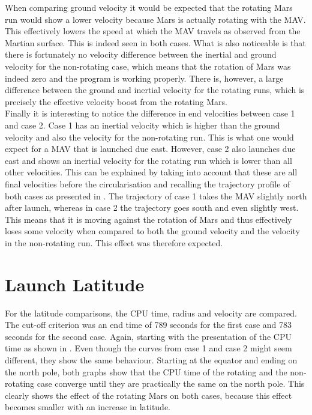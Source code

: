 \noindent
When comparing ground velocity it would be expected that the rotating Mars run would show a lower velocity because Mars is actually rotating with the \ac{MAV}. This effectively lowers the speed at which the \ac{MAV} travels as observed from the Martian surface. This is indeed seen in both cases. What is also noticeable is that there is fortunately no velocity difference between the inertial and ground velocity for the non-rotating case, which means that the rotation of Mars was indeed zero and the program is working properly. There is, however, a large difference between the ground and inertial velocity for the rotating runs, which is precisely the effective velocity boost from the rotating Mars.\\

\noindent
Finally it is interesting to notice the difference in end velocities between case 1 and case 2. Case 1 has an inertial velocity which is higher than the ground velocity and also the velocity for the non-rotating run. This is what one would expect for a \ac{MAV} that is launched due east. However, case 2 also launches due east and shows an inertial velocity for the rotating run which is lower than all other velocities. This can be explained by taking into account that these are all final velocities before the circularisation and recalling the trajectory profile of both cases as presented in . The trajectory of case 1 takes the \ac{MAV} slightly north after launch, whereas in case 2 the trajectory goes south and even slightly west. This means that it is moving against the rotation of Mars and thus effectively loses some velocity when compared to both the ground velocity and the velocity in the non-rotating run. This effect was therefore expected.


%





\section{Launch Latitude}
\label{sec:launchLatitude}
For the latitude comparisons, the CPU time, radius and velocity are compared.  The cut-off criterion was an end time of 789 seconds for the first case and 783 seconds for the second case. Again, starting with the presentation of the CPU time as shown in . Even though the curves from case 1 and case 2 might seem different, they show the same behaviour. Starting at the equator and ending on the north pole, both graphs show that the CPU time of the rotating and the non-rotating case converge until they are practically the same on the north pole. This clearly shows the effect of the rotating Mars on both cases, because this effect becomes smaller with an increase in latitude.

